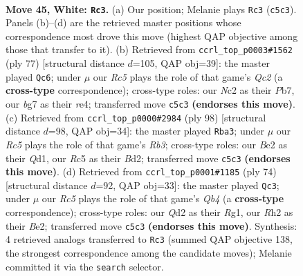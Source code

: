 \documentclass[11pt]{article}
\begin{document}
\clearpage

\begin{figure}[p]\centering
\begin{subfigure}{0.46\textwidth}\centering
\resizebox{\linewidth}{!}{%
\newchessgame
\chessboard[
  setfen={rn1qk2r/4n1b1/2p3p1/2Rp2P1/3P1P1p/1P5P/1BNQB2R/6K1 w - - 19 45},
  showmover=false,
  pgfstyle=straightmove, color=movearrow, markmove={c5-c3}
]}
\caption{}
\end{subfigure}\hfill
\begin{subfigure}{0.46\textwidth}\centering
\resizebox{\linewidth}{!}{%
\newchessgame
\chessboard[
  setfen={6k1/1pq1bp2/p3p1p1/2r4p/P3R3/2PQN1P1/1P3PP1/5K2 b - - 0 39},
  showmover=false,
  pgfstyle=straightmove, color=movearrow, markmove={c7-c6}
]}
\caption{}
\end{subfigure}
\\[4pt]
\begin{subfigure}{0.46\textwidth}\centering
\resizebox{\linewidth}{!}{%
\newchessgame
\chessboard[
  setfen={r2b1qk1/r6n/Pp1p2n1/2pPp3/R1P1PpP1/1R5N/K2BB2P/3Q4 w - - 1 50},
  showmover=false,
  pgfstyle=straightmove, color=movearrow, markmove={b3-a3}
]}
\caption{}
\end{subfigure}\hfill
\begin{subfigure}{0.46\textwidth}\centering
\resizebox{\linewidth}{!}{%
\newchessgame
\chessboard[
  setfen={2b5/1r4nk/r2p2q1/3N1p1p/1QP1pP1P/6P1/3RB3/6RK w - - 5 38},
  showmover=false,
  pgfstyle=straightmove, color=movearrow, markmove={b4-c3}
]}
\caption{}
\end{subfigure}
\caption{\textbf{Move 45, White: \texttt{Rc3}.} (a) Our position; Melanie plays \texttt{Rc3} (\texttt{c5c3}). Panels (b)--(d) are the retrieved master positions whose correspondence most drove this move (highest QAP objective among those that transfer to it). (b) Retrieved from \texttt{ccrl\_top\_p0003\#1562} (ply 77) [structural distance $d$=105, QAP obj=39]: the master played \texttt{Qc6}; under $\mu$ our \emph{Rc5} plays the role of that game's \emph{Qc2} (a \textbf{cross-type} correspondence); cross-type roles: our \emph{N}c2 as their \emph{P}b7, our \emph{b}g7 as their \emph{r}e4; transferred move \texttt{c5c3} \textbf{(endorses this move)}. (c) Retrieved from \texttt{ccrl\_top\_p0000\#2984} (ply 98) [structural distance $d$=98, QAP obj=34]: the master played \texttt{Rba3}; under $\mu$ our \emph{Rc5} plays the role of that game's \emph{Rb3}; cross-type roles: our \emph{B}e2 as their \emph{Q}d1, our \emph{R}c5 as their \emph{B}d2; transferred move \texttt{c5c3} \textbf{(endorses this move)}. (d) Retrieved from \texttt{ccrl\_top\_p0001\#1185} (ply 74) [structural distance $d$=92, QAP obj=33]: the master played \texttt{Qc3}; under $\mu$ our \emph{Rc5} plays the role of that game's \emph{Qb4} (a \textbf{cross-type} correspondence); cross-type roles: our \emph{Q}d2 as their \emph{R}g1, our \emph{R}h2 as their \emph{B}e2; transferred move \texttt{c5c3} \textbf{(endorses this move)}. Synthesis: 4 retrieved analogs transferred to \texttt{Rc3} (summed QAP objective 138, the strongest correspondence among the candidate moves); Melanie committed it via the \texttt{search} selector.}
\label{fig:thought-m88}
\end{figure}
\end{document}
